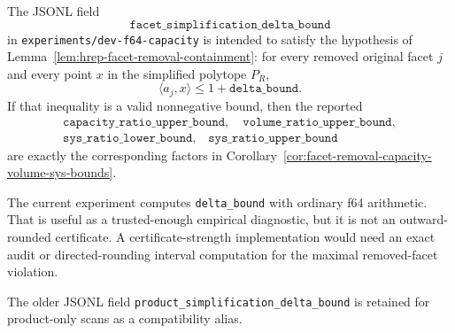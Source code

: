 \begin{unverified}
\begin{remark}
\label{rem:product-simplification-experiment-contract}
The JSONL field
\[
  \texttt{facet\_simplification\_delta\_bound}
\]
in \texttt{experiments/dev-f64-capacity} is intended to satisfy the hypothesis of
Lemma~\ref{lem:hrep-facet-removal-containment}: for every removed original facet
$j$ and every point $x$ in the simplified polytope $P_R$,
\[
  \langle a_j,x\rangle \leq 1+\texttt{delta\_bound}.
\]
If that inequality is a valid nonnegative bound, then the reported
\[
\begin{gathered}
  \texttt{capacity\_ratio\_upper\_bound},\quad
  \texttt{volume\_ratio\_upper\_bound},\\
  \texttt{sys\_ratio\_lower\_bound},\quad
  \texttt{sys\_ratio\_upper\_bound}
\end{gathered}
\]
are exactly the corresponding factors in
Corollary~\ref{cor:facet-removal-capacity-volume-sys-bounds}.

The current experiment computes \texttt{delta\_bound} with ordinary f64
arithmetic. That is useful as a trusted-enough empirical diagnostic, but it is
not an outward-rounded certificate. A certificate-strength implementation
would need an exact audit or directed-rounding interval computation for the
maximal removed-facet violation.

The older JSONL field \texttt{product\_simplification\_delta\_bound} is retained
for product-only scans as a compatibility alias.
\end{remark}
\end{unverified}
